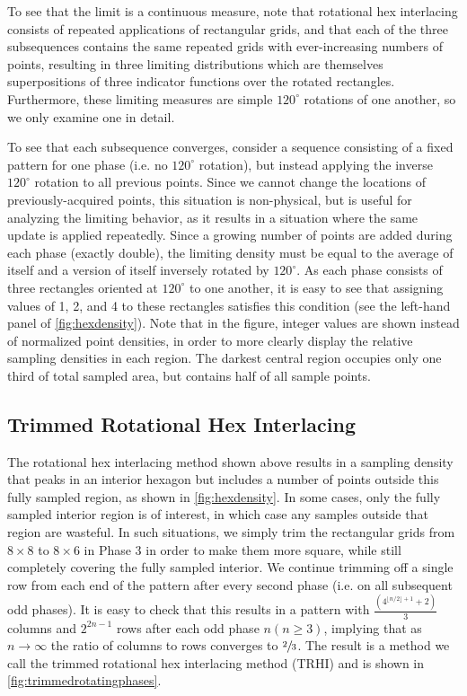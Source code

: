 \documentclass[aip, amsmath, amssymb, nobibnotes, nofootinbib, citeautoscript, reprint, superscriptaddress]{revtex4-2}
\begin{document}
    To see that the limit is a continuous measure, note that rotational hex interlacing consists of repeated applications of rectangular grids, and that each of the three subsequences contains the same repeated grids with ever-increasing numbers of points, resulting in three limiting distributions which are themselves superpositions of three indicator functions over the rotated rectangles.
    Furthermore, these limiting measures are simple $120^{\circ}$ rotations of one another, so we only examine one in detail.


    To see that each subsequence converges, consider a sequence consisting of a fixed pattern for one phase (i.e. no $120^{\circ}$ rotation), but instead applying the inverse $120^{\circ}$ rotation to all previous points.
    Since we cannot change the locations of previously-acquired points, this situation is non-physical, but is useful for analyzing the limiting behavior, as it results in a situation where the same update is applied repeatedly.
    Since a growing number of points are added during each phase (exactly double), the limiting density must be equal to the average of itself and a version of itself inversely rotated by $120^{\circ}$.
    As each phase consists of three rectangles oriented at $120^{\circ}$ to one another, it is easy to see that assigning values of 1, 2, and 4 to these rectangles satisfies this condition (see the left-hand panel of \autoref{fig:hexdensity}).
    Note that in the figure, integer values are shown instead of normalized point densities, in order to more clearly display the relative sampling densities in each region.
    The darkest central region occupies only one third of total sampled area, but contains half of all sample points.

    \subsection{\label{ssec:trimmed}Trimmed Rotational Hex Interlacing}

    The rotational hex interlacing method shown above results in a sampling density that peaks in an interior hexagon but includes a number of points outside this fully sampled region, as shown in \autoref{fig:hexdensity}.
    In some cases, only the fully sampled interior region is of interest, in which case any samples outside that region are wasteful.
    In such situations, we simply trim the rectangular grids from $8\times 8$ to $8\times 6$ in
    Phase 3 in order to make them more square, while still completely covering the fully sampled interior.
    We continue trimming off a single row from each end of the pattern after every second phase (i.e. on all subsequent odd phases).
    It is easy to check that this results in a pattern with $\frac{\left(4^{\lfloor n/2\rfloor + 1} + 2\right)}{3}$ columns and $2^{2n - 1}$ rows after each odd phase $n\left(n\ge 3\right)$, implying that as $n\to\infty$ the
    ratio of columns to rows converges to $\sfrac{2}{3}$.
    The result is a method we call the trimmed rotational hex interlacing method (TRHI) and is shown in \autoref{fig:trimmedrotatingphases}.
\end{document}

